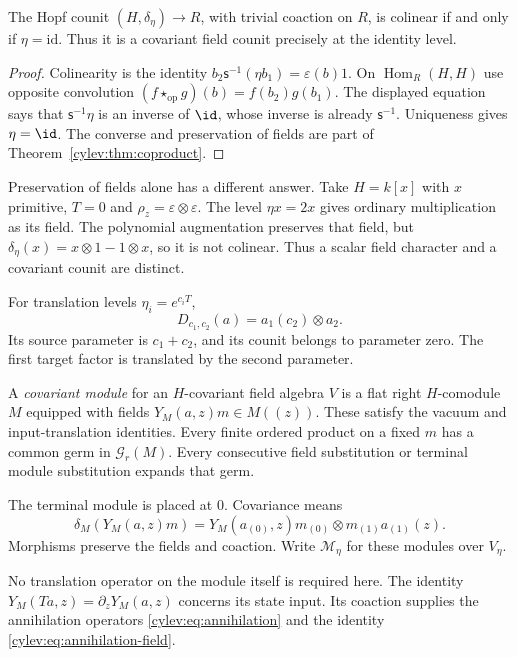 \begin{proposition}\label{cylev:prop:counit}
The Hopf counit $(H,\delta_\eta)\to R$, with trivial coaction on $R$,
is colinear if and only if $\eta=\mathrm{id}$.
Thus it is a covariant field counit precisely at the identity level.
\end{proposition}
\begin{proof}
Colinearity is the identity
$b_2\mathsf s^{-1}(\eta b_1)=\varepsilon(b)1$.
On $\operatorname{Hom}_R(H,H)$ use opposite convolution
$(f\star_{\mathrm{op}}g)(b)=f(b_2)g(b_1)$.
The displayed equation says that $\mathsf s^{-1}\eta$ is an inverse
of $\id$, whose inverse is already $\mathsf s^{-1}$.
Uniqueness gives $\eta=\id$.
The converse and preservation of fields are part of
Theorem~\ref{cylev:thm:coproduct}.
\end{proof}

Preservation of fields alone has a different answer.
Take $H=k[x]$ with $x$ primitive, $T=0$ and
$\rho_z=\varepsilon\otimes\varepsilon$.
The level $\eta x=2x$ gives ordinary multiplication as its field.
The polynomial augmentation preserves that field, but
$\delta_\eta(x)=x\otimes1-1\otimes x$, so it is not colinear.
Thus a scalar field character and a covariant counit are distinct.

For translation levels $\eta_i=e^{c_iT}$,
\[
 D_{c_1,c_2}(a)=a_1(c_2)\otimes a_2.
\]
Its source parameter is $c_1+c_2$, and its counit belongs to parameter
zero. The first target factor is translated by the second parameter.

\begin{definition}\label{cylev:def:module}
A \emph{covariant module} for an $H$-covariant field algebra $V$ is
a flat right $H$-comodule $M$ equipped with fields $Y_M(a,z)m\in M((z))$.
These satisfy the vacuum and input-translation identities.
Every finite ordered product on a fixed $m$ has a common germ
in $\mathcal G_r(M)$.
Every consecutive field substitution or terminal module substitution
expands that germ.

The terminal module is placed at $0$. Covariance means
\begin{equation}\label{cylev:eq:module-covariance}
 \delta_M(Y_M(a,z)m)
       =Y_M(a_{(0)},z)m_{(0)}\otimes m_{(1)}a_{(1)}(z).
\end{equation}
Morphisms preserve the fields and coaction.
Write $\mathcal M_\eta$ for these modules over $V_\eta$.
\end{definition}

No translation operator on the module itself is required here.
The identity $Y_M(Ta,z)=\partial_zY_M(a,z)$ concerns its state input.
Its coaction supplies the annihilation operators
\eqref{cylev:eq:annihilation} and the identity
\eqref{cylev:eq:annihilation-field}.


